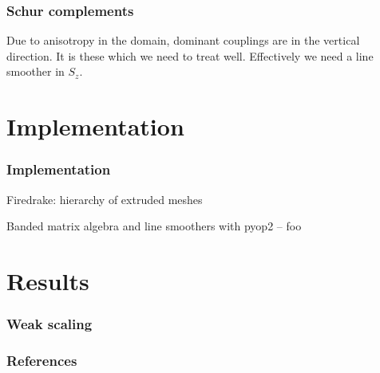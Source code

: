 \documentclass[presentation]{beamer}
\begin{document}
\begin{frame}
  \frametitle{Schur complements}
  Due to anisotropy in the domain, dominant couplings are in the
  vertical direction.  It is these which we need to treat well.
  Effectively we need a line smoother in $S_z$.

  
\end{frame}

\section{Implementation}

\begin{frame}
  \frametitle{Implementation}
  Firedrake: hierarchy of extruded meshes

  Banded matrix algebra and line smoothers with pyop2 -- foo
\end{frame}

\section{Results}

\begin{frame}
  \frametitle{Weak scaling}
  
\end{frame}
\appendix
\begin{frame}[allowframebreaks]
  \frametitle{References}
  
  
\end{frame}
\end{document}
